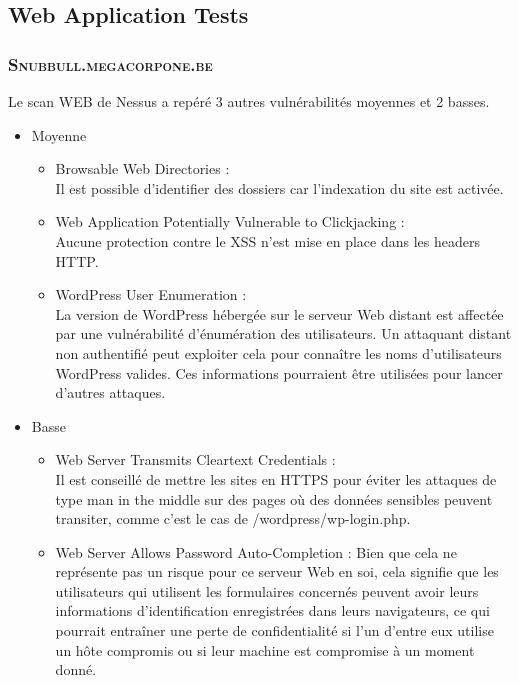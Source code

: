\documentclass[a4paper]{article}
\begin{document}
\subsection{Web Application Tests}
\subsubsection{\textsc{Snubbull.megacorpone.be}}\label{app:vulns6}
Le scan WEB de Nessus a repéré 3 autres vulnérabilités moyennes et 2 basses.
\begin{itemize}
    \item Moyenne
    \begin{itemize}
        \item Browsable Web Directories :\\
        Il est possible d'identifier des dossiers car l'indexation du site est activée.
        \item Web Application Potentially Vulnerable to Clickjacking :\\
        Aucune protection contre le XSS n'est mise en place dans les headers HTTP.
        \item WordPress User Enumeration :\\
        La version de WordPress hébergée sur le serveur Web distant est affectée par une vulnérabilité d'énumération des utilisateurs. Un attaquant distant non authentifié peut exploiter cela pour connaître les noms d'utilisateurs WordPress valides. Ces informations pourraient être utilisées pour lancer d'autres attaques. 
    \end{itemize}
    \item Basse
    \begin{itemize}
        \item Web Server Transmits Cleartext Credentials :\\
        Il est conseillé de mettre les sites en HTTPS pour éviter les attaques de type man in the middle sur des pages où des données sensibles peuvent transiter, comme c'est le cas de /wordpress/wp-login.php.
        \item Web Server Allows Password Auto-Completion :
        Bien que cela ne représente pas un risque pour ce serveur Web en soi, cela signifie que les utilisateurs qui utilisent les formulaires concernés peuvent avoir leurs informations d'identification enregistrées dans leurs navigateurs, ce qui pourrait entraîner une perte de confidentialité si l'un d'entre eux utilise un hôte compromis ou si leur machine est compromise à un moment donné.
    \end{itemize}
\end{itemize}
\end{document}
